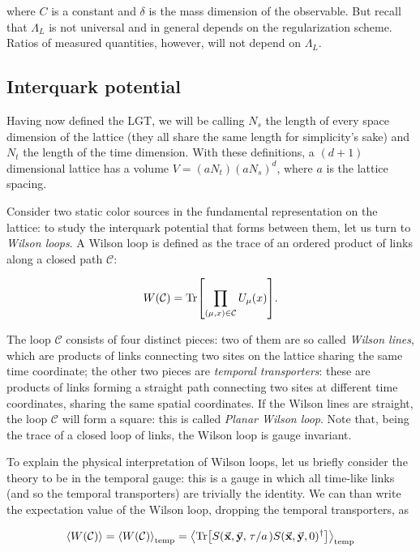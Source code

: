 \documentclass[reqno,12pt]{article}
\numberwithin{equation}{section}
\begin{document}
where $C$ is a constant and $\delta$ is the mass dimension of the observable. But recall that $\Lambda_L$ is not universal and
in general depends on the regularization scheme. Ratios of measured quantities, however, will not depend on $\Lambda_L$.

\subsection{Interquark potential} \label{potential}

Having now defined the LGT, we will be calling $N_s$ the length of every space dimension of the lattice (they 
all share the same length for simplicity's sake) and $N_t$ the length of the time dimension. With these definitions,
a $(d+1)$ dimensional lattice has a volume $V = (aN_t)(aN_s)^d$, where $a$ is the lattice spacing.

Consider two static color sources in the fundamental representation
on the lattice: to study the interquark potential that forms between them,
let us turn to \textit{Wilson loops}. A Wilson loop is defined as the trace of an ordered product 
of links along a closed path $\mathcal{C}$:

\begin{equation}
	W(\mathcal{C}) = \Tr[\prod_{(\mu,x)\in\mathcal{C}} U_\mu(x)].
\end{equation}

The loop $\mathcal{C}$ consists of four distinct pieces: two of them are so called \textit{Wilson lines}, which are 
products of links connecting two sites on the lattice sharing the same time coordinate; the other two pieces
are \textit{temporal transporters}: these are products of links forming a straight path connecting two sites at
different time coordinates, sharing the same spatial coordinates. If the Wilson lines are straight, the loop
$\mathcal{C}$ will form a square: this is called \textit{Planar Wilson loop}. Note that, being the trace of a closed
loop of links, the Wilson loop is gauge invariant.

To explain the physical interpretation of Wilson loops, let us briefly consider the theory to be in the temporal
gauge: this is a gauge in which all time-like links (and so the temporal transporters) are trivially the identity.
We can than write the expectation value of the Wilson loop, dropping the temporal transporters, as 

\begin{equation}
	\expval{W(\mathcal{C})} = \expval{W(\mathcal{C})}_\text{temp} = 
	\expval{\Tr[S(\va{x}, \va{y}, \flatfrac{\tau}{a})S(\va{x}, \va{y}, 0)^\dagger]}_\text{temp}
\end{equation}
\end{document}
